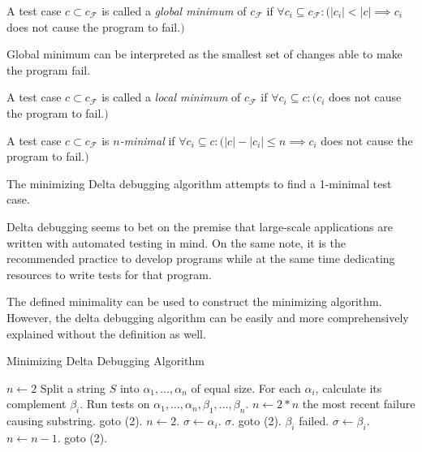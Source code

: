 \begin{defn}\label{def02:2}
  A test case $c \subset c_\mathcal{F}$ is called a \emph{global minimum}
  of $c_\mathcal{F}$ if $\forall c_i \subseteq c_\mathcal{F}:
  (|c_i| < |c| \implies c_i$ does not cause the program to fail.$)$
\end{defn}

Global minimum can be interpreted as the smallest set of changes able to
make the program fail.

\begin{defn}\label{def02:3}
  A test case $c \subset c_\mathcal{F}$ is called a \emph{local minimum}
  of $c_\mathcal{F}$ if $\forall c_i \subseteq c:
  (c_i$ does not cause the program to fail.$)$
\end{defn}

\begin{defn}[$n$-minimality]\label{def02:4}
  A test case $c \subset c_\mathcal{F}$ is \emph{$n$-minimal}
  if $\forall c_i \subseteq c:
  (|c| - |c_i| \leq n \implies c_i$ does not cause the program to fail.$)$
\end{defn}

The minimizing Delta debugging algorithm attempts to find a 1-minimal test case.

Delta debugging seems to bet on the premise that large-scale applications are written
with automated testing in mind. On the same note, it is the recommended practice to
develop programs while at the same time dedicating resources to write tests for that
program.

The defined minimality can be used to construct the minimizing algorithm. 
However, the delta debugging algorithm can be easily and more comprehensively explained 
without the definition as well.

\begin{algorithm}
	\caption{Minimizing Delta Debugging Algorithm} 
	\begin{algorithmic}[1]
		\State $n \leftarrow 2$
		\State Split a string $S$ into $\alpha_1,\dots,\alpha_n$ of equal size.
		\State For each $\alpha_i$, calculate its complement $\beta_i$.
		\State Run tests on $\alpha_1,\dots,\alpha_n,\beta_1,\dots,\beta_n$.
			\State $n \leftarrow 2*n$
				\Return the most recent failure causing substring.
			\Else
				\State goto (2).
			\EndIf
			\State $n \leftarrow 2$.
			\State $\sigma \leftarrow \alpha_i$.
				\Return $\sigma$.
			\Else
				\State goto (2).
			\EndIf
		\Else
			\Comment $\beta_i$ failed.
			\State $\sigma \leftarrow \beta_i$.
			\State $n \leftarrow n - 1$.
			\State goto (2).
		\EndIf
	\end{algorithmic} 
\end{algorithm}

